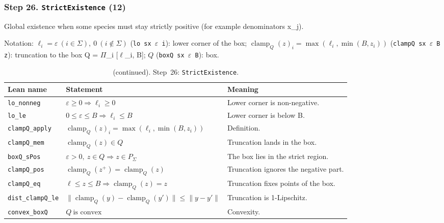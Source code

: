 \subsubsection*{Step 26. \texttt{StrictExistence} (12)}
Global existence when some species must stay strictly positive (for example denominators x\_j).

{\small\raggedright Notation: $\ell_i=\varepsilon\ (i\in\Sigma),\ 0\ (i\notin\Sigma)$ (\texttt{lo sx $\varepsilon$ i}): lower corner of the box; $\operatorname{clamp}_Q(z)_i=\max(\ell_i,\min(B,z_i))$ (\texttt{clampQ sx $\varepsilon$ B z}): truncation to the box Q = $\Pi$\_i [$\ell$\_i, B]; $Q$ (\texttt{boxQ sx $\varepsilon$ B}): box.}

\addtocounter{table}{-1}
{\small
\begin{longtable}{@{}>{\raggedright\arraybackslash}p{3.6cm}>{\raggedright\arraybackslash}p{6.6cm}>{\raggedright\arraybackslash}p{5.6cm}@{}}
\caption[]{(continued). Step~26: \texttt{StrictExistence}.}\\
\toprule
Lean name & Statement & Meaning \\
\midrule
\endhead
\texttt{lo\_\allowbreak{}nonneg} & $\displaystyle \varepsilon\ge0\Rightarrow\ell_i\ge0$ & Lower corner is non-negative. \\[3pt]
\texttt{lo\_\allowbreak{}le} & $\displaystyle 0\le\varepsilon\le B\Rightarrow\ell_i\le B$ & Lower corner is below B. \\[3pt]
\texttt{clampQ\_\allowbreak{}apply} & $\displaystyle \operatorname{clamp}_Q(z)_i=\max(\ell_i,\min(B,z_i))$ & Definition. \\[3pt]
\texttt{clampQ\_\allowbreak{}mem} & $\displaystyle \operatorname{clamp}_Q(z)\in Q$ & Truncation lands in the box. \\[3pt]
\texttt{boxQ\_\allowbreak{}sPos} & $\displaystyle \varepsilon>0,\ z\in Q\Rightarrow z\in P_\Sigma$ & The box lies in the strict region. \\[3pt]
\texttt{clampQ\_\allowbreak{}pos} & $\displaystyle \operatorname{clamp}_Q(z^+)=\operatorname{clamp}_Q(z)$ & Truncation ignores the negative part. \\[3pt]
\texttt{clampQ\_\allowbreak{}eq} & $\displaystyle \ell\le z\le B\Rightarrow\operatorname{clamp}_Q(z)=z$ & Truncation fixes points of the box. \\[3pt]
\texttt{dist\_\allowbreak{}clampQ\_\allowbreak{}le} & $\displaystyle \|\operatorname{clamp}_Q(y)-\operatorname{clamp}_Q(y')\|\le\|y-y'\|$ & Truncation is 1-Lipschitz. \\[3pt]
\texttt{convex\_\allowbreak{}boxQ} & $\displaystyle Q\ \text{is convex}$ & Convexity. \\[3pt]

\end{longtable}}
